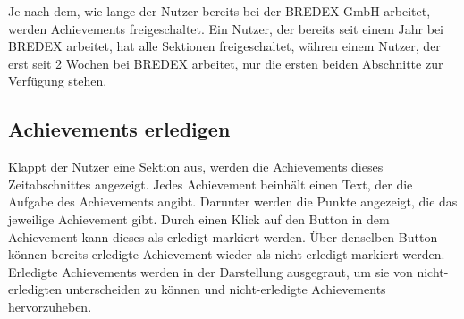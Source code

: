 \documentclass[11pt]{article}
\begin{document}
Je nach dem, wie lange der Nutzer bereits bei der BREDEX GmbH arbeitet, werden Achievements freigeschaltet. Ein Nutzer, der 
bereits seit einem Jahr bei BREDEX arbeitet, hat alle Sektionen freigeschaltet, währen einem Nutzer, der erst seit 2 Wochen bei BREDEX
arbeitet, nur die ersten beiden Abschnitte zur Verfügung stehen.
\clearpage
\subsection{Achievements erledigen}

Klappt der Nutzer eine Sektion aus, werden die Achievements dieses Zeitabschnittes angezeigt.
Jedes Achievement beinhält einen Text, der die Aufgabe des Achievements angibt. Darunter werden die Punkte angezeigt, die das jeweilige Achievement gibt.
Durch einen Klick auf den Button in dem Achievement kann dieses als erledigt markiert werden. Über denselben Button können bereits
erledigte Achievement wieder als nicht-erledigt markiert werden.
Erledigte Achievements werden in der Darstellung ausgegraut, um sie von nicht-erledigten unterscheiden zu können und nicht-erledigte Achievements hervorzuheben.
\end{document}
